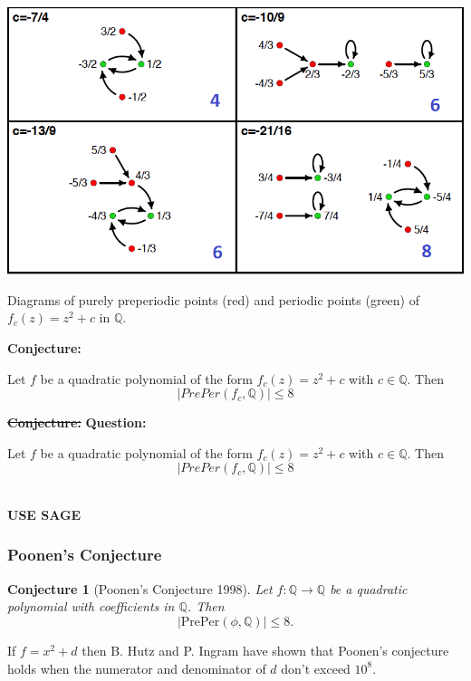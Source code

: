 \documentclass{beamer}
\def\jump{ \quad \\ \vspace{0.7cm} \pause}
\def\QQ{{\mathbb Q}}
\theoremstyle{thmstyle}
\theoremstyle{thmstyle}
\theoremstyle{thmstyle}
\theoremstyle{mystyle}
\newtheorem*{conjecture}{Conjecture}
\theoremstyle{qstnstyle}
\begin{document}
\begin{frame}
\begin{center}
\includegraphics[width=1.0\linewidth]{placeholder2Number}
\end{center}
Diagrams of purely preperiodic points (red) and periodic points (green) of  $f_c(z)=z^2+c$ in $\QQ$.
\end{frame}

\begin{frame}

\textbf{Conjecture:}

Let $f$ be a quadratic polynomial of the form $f_c(z)=z^2+c$ with $c\in\QQ$. Then
$$|PrePer(f_c,\QQ)| \leq 8 $$

\end{frame}

\begin{frame}
\sout{\textbf{Conjecture:}}  \textbf{Question:}

Let $f$ be a quadratic polynomial of the form $f_c(z)=z^2+c$ with $c\in\QQ$. Then
$$|PrePer(f_c,\QQ)| \leq 8 $$

\jump
\Huge{\textbf{USE SAGE}}
\end{frame}


\begin{frame}
\frametitle{Poonen's Conjecture}
\begin{conjecture}[Poonen's Conjecture
  1998]
Let $f:\QQ \to \QQ$ be a quadratic polynomial with coefficients in $\QQ$. Then 
$$|\text{PrePer}(\phi,\QQ)| \leq 8.$$
\end{conjecture}

\vspace{10mm}

If $f = x^2 + d$ then B. Hutz and P. Ingram have shown that Poonen's
conjecture holds when the numerator and denominator of $d$ don't exceed
$10^8$.

\end{frame}
\end{document}
